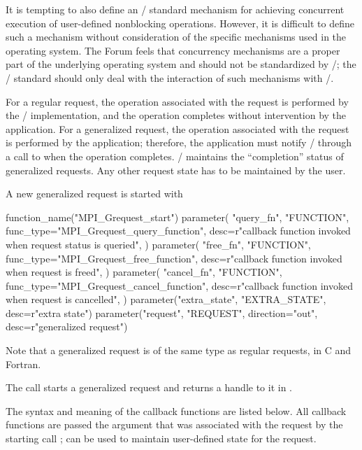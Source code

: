 \begin{rationale}
It is tempting to also define an \MPI/ standard mechanism for
achieving concurrent execution of
user-defined nonblocking operations.  
However, it is difficult to define such a mechanism without
consideration of the specific mechanisms used in the operating system.
The Forum feels that concurrency mechanisms are a proper part
of the underlying operating system and should not be standardized by
\MPI/; the \MPI/ standard should only deal with the interaction of
such mechanisms with \MPI/.
\end{rationale}

For a regular request, the operation associated with the request is
performed by the \MPI/ implementation, and the operation
completes without intervention by the application.  For a generalized
request, the operation associated with the request is performed by the
application; therefore, the application must notify \MPI/ 
through a call to  when the
operation completes.
\MPI/ maintains the ``completion'' status of generalized requests.  Any
other request state has to be maintained by the user. 
 
A new generalized request is started with

%
\begin{mpi-binding}
    function_name("MPI_Grequest_start")
    parameter(
        "query_fn",
        "FUNCTION",
        func_type="MPI_Grequest_query_function",
        desc=r"callback function invoked when request status is queried",
    )
    parameter(
        "free_fn",
        "FUNCTION",
        func_type="MPI_Grequest_free_function",
        desc=r"callback function invoked when request is freed",
    )
    parameter(
        "cancel_fn",
        "FUNCTION",
        func_type="MPI_Grequest_cancel_function",
        desc=r"callback function invoked when request is cancelled",
    )
    parameter("extra_state", "EXTRA_STATE", desc=r"extra state")
    parameter("request", "REQUEST", direction="out", desc=r"generalized request")
\end{mpi-binding}

\begin{users}
Note that a generalized request is of the same type as regular requests, in C and Fortran.
\end{users}

The call starts a generalized request and returns a handle to it in
.

The syntax and meaning of the callback functions are listed below.
All callback functions are passed the  argument
that was associated with the request by the starting call
;  can be used to maintain user-defined
state for the request.  

